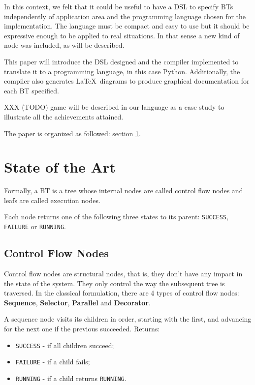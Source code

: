 \documentclass[a4paper,UKenglish,cleveref, autoref, thm-restate]{oasics-v2019}
\begin{document}
In this context, we felt that it could be useful to have a DSL to specify BTs independently of application area and the programming language chosen for the implementation.
The language must be compact and easy to use but it should be expressive enough to be applied to real situations.
In that sense a new kind of node was included, as will be described.

This paper will introduce the DSL designed and the compiler implemented to translate it to a programming language, in this case Python.
Additionally, the compiler also generates \LaTeX\ diagrams to produce graphical documentation for each BT specified.

XXX (TODO) game will be described in our language as a case study to illustrate all the achievements attained.

The paper is organized as followed: section \ref{sec:state-of-the-art}.


\section{State of the Art}
\label{sec:state-of-the-art}
Formally, a BT is a tree whose internal nodes are called control flow nodes and leafs are called execution nodes.

Each node returns one of the following three states to its parent: \texttt{SUCCESS}, \texttt{FAILURE} or \texttt{RUNNING}.

\subsection{Control Flow Nodes}
Control flow nodes are structural nodes, that is, they don't have any impact in the state of the system. They only control the way the subsequent tree is traversed.
In the classical formulation, there are 4 types of control flow nodes: \textbf{Sequence}, \textbf{Selector}, \textbf{Parallel} and \textbf{Decorator}.

A sequence node visits its children in order, starting with the first, and advancing for the next one if the previous succeeded.
Returns:
\begin{itemize}
    \item \texttt{SUCCESS} - if all children succeed;
    \item \texttt{FAILURE} - if a child fails;
    \item \texttt{RUNNING} - if a child returns \texttt{RUNNING}.
\end{itemize}
\end{document}
